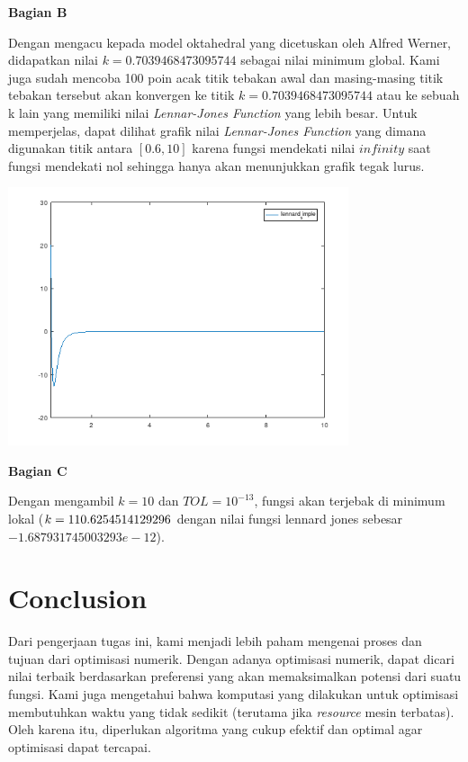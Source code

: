 \documentclass[11pt]{article}
\begin{document}
\textbf{Bagian B}

\medskip

Dengan mengacu kepada model oktahedral yang dicetuskan oleh Alfred Werner, didapatkan nilai $k = 0.7039468473095744$ sebagai nilai minimum global. Kami juga sudah mencoba 100 poin acak titik tebakan awal dan masing-masing titik tebakan tersebut akan konvergen ke titik $k = 0.7039468473095744$ atau ke sebuah k lain yang memiliki nilai \textit{Lennar-Jones Function} yang lebih besar. Untuk memperjelas, dapat dilihat grafik nilai \textit{Lennar-Jones Function} yang dimana digunakan titik antara $[0.6, 10]$ karena fungsi mendekati nilai $infinity$ saat fungsi mendekati nol sehingga hanya akan menunjukkan grafik tegak lurus.

\centerline{\includegraphics[width=10cm]{img/LJ_Graph_rapi.png}}

\textbf{Bagian C} 

\medskip

Dengan mengambil $k = 10$ dan $TOL = 10^{-13}$, fungsi akan terjebak di minimum lokal ($k =\\110.6254514129296$ dengan nilai fungsi lennard jones sebesar $-1.687931745003293e-12$).


\section{Conclusion}
Dari pengerjaan tugas ini, kami menjadi lebih paham mengenai proses dan tujuan dari optimisasi numerik. Dengan adanya optimisasi numerik, dapat dicari nilai terbaik berdasarkan preferensi yang akan memaksimalkan potensi dari suatu fungsi. Kami juga mengetahui bahwa komputasi yang dilakukan untuk optimisasi membutuhkan waktu yang tidak sedikit (terutama jika \textit{resource} mesin terbatas). Oleh karena itu, diperlukan algoritma yang cukup efektif dan optimal agar optimisasi dapat tercapai.
\end{document}
